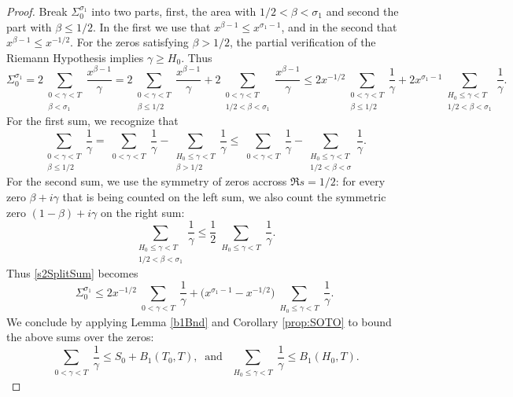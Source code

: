 \documentclass[10pt]{amsart}
\theoremstyle{definition}
\numberwithin{equation}{section}
\begin{document}
\begin{proof}
Break $\Sigma_0^{\sigma_1}$ into two parts, first, the area with $1/2 < \beta < \sigma_1$ and second the part with $\beta \le  1/2$.
In the first we use that $x^{\beta-1} \le  x^{\sigma_1-1}$, and in the second that $x^{\beta-1} \le  x^{-1/2}$.
For the zeros satisfying $\beta > 1/2$, the partial verification of the Riemann Hypothesis implies $\gamma\ge H_0$. 
Thus
\begin{equation}\label{s2SplitSum}
\Sigma_0^{\sigma_1}
= 2\sum_{\substack{ 0 < \gamma < T \\ \beta < \sigma_1}} \frac{x^{\beta-1}}{\gamma} 
= 2\sum_{\substack{ 0 < \gamma < T \\ \beta \le  1/2}} \frac{x^{\beta-1}}{\gamma}
+ 2\sum_{\substack{ 0 < \gamma < T \\ 1/2 < \beta < \sigma_1}} \frac{x^{\beta-1}}{\gamma}
\le2 x^{-1/2}\sum_{\substack{ 0 < \gamma < T \\ \beta \le  1/2}} \frac{1}{\gamma}
+ 2 x^{\sigma_1-1} \sum_{\substack{ H_0 \le \gamma < T \\ 1/2 < \beta < \sigma_1}} \frac{1}{\gamma}.
\end{equation}
For the first sum, we recognize that
\[
\sum_{\substack{ 0 < \gamma < T \\ \beta \le  1/2}} \frac{1}{\gamma}
=
\sum_{\substack{ 0 < \gamma < T }} \frac{1}{\gamma}
- 
\sum_{\substack{ H_0 \le \gamma < T \\ \beta >  1/2}} \frac{1}{\gamma}
\le 
\sum_{\substack{ 0 < \gamma < T }} \frac{1}{\gamma}
- 
\sum_{\substack{ H_0 \le \gamma < T \\ 1/2< \beta < \sigma }} \frac{1}{\gamma}.
\]
For the second sum, we use the symmetry of zeros accross $\Re s=1/2$: for every zero $\beta + i\gamma$ that is being counted on the left sum, we also count the symmetric zero $(1-\beta) + i\gamma$ on the right sum:
\[
\sum_{\substack{ H_0 \le \gamma < T \\ 1/2 < \beta < \sigma_1}} \frac{1}{\gamma}
\le 
\frac12\sum_{\substack{ H_0 \le \gamma < T  }} \frac{1}{\gamma}.
\]
 Thus \eqref{s2SplitSum} becomes
\begin{equation}\label{s2SplitSum1}
\Sigma_0^{\sigma_1}
\le 2x^{-1/2} \sum_{\substack{ 0 < \gamma < T }} \frac{1}{\gamma}
+  \Big( x^{\sigma_1-1} - x^{-1/2} \Big)\sum_{\substack{ H_0 \le \gamma < T  }} \frac{1}{\gamma}.
\end{equation}
%
We conclude by applying Lemma \ref{b1Bnd} and Corollary \ref{prop:SOTO} to bound the above sums over the zeros:
\begin{equation}
\sum_{\substack{ 0 < \gamma < T }} \frac{1}{\gamma} \le S_0 + B_1(T_0, T)
,\ \text{ and }\ 
\sum_{\substack{ H_0 \le \gamma < T  }} \frac{1}{\gamma}\le B_1(H_0, T).
\end{equation}
%
\end{proof}
\end{document}
